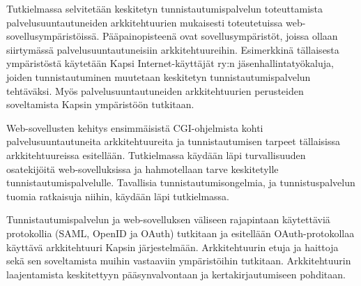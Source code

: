 Tutkielmassa selvitetään keskitetyn tunnistautumispalvelun toteuttamista palvelusuuntautuneiden arkkitehtuurien mukaisesti toteutetuissa web-sovellusympäristöissä. Pääpainopisteenä ovat sovellusympäristöt, joissa ollaan siirtymässä palvelusuuntautuneisiin arkkitehtuureihin. Esimerkkinä tällaisesta ympäristöstä käytetään Kapsi Internet-käyttäjät ry:n jäsenhallintatyökaluja, joiden tunnistautuminen muutetaan keskitetyn tunnistautumispalvelun tehtäväksi. Myös palvelusuuntautuneiden arkkitehtuurien perusteiden soveltamista Kapsin ympäristöön tutkitaan.

Web-sovellusten kehitys ensimmäisistä CGI-ohjelmista kohti palvelusuuntautuneita arkkitehtuureita ja tunnistautumisen tarpeet tällaisissa arkkitehtuureissa esitellään. Tutkielmassa käydään läpi turvallisuuden osatekijöitä web-sovelluksissa ja hahmotellaan tarve keskitetylle tunnistautumispalvelulle. Tavallisia tunnistautumisongelmia, ja tunnistuspalvelun tuomia ratkaisuja niihin, käydään läpi tutkielmassa.

Tunnistautumispalvelun ja web-sovelluksen väliseen rajapintaan käytettäviä protokollia (SAML, OpenID ja OAuth) tutkitaan ja esitellään OAuth-protokollaa käyttävä arkkitehtuuri Kapsin järjestelmään. Arkkitehtuurin etuja ja haittoja sekä sen soveltamista muihin vastaaviin ympäristöihin tutkitaan. Arkkitehtuurin laajentamista keskitettyyn pääsynvalvontaan ja kertakirjautumiseen pohditaan.